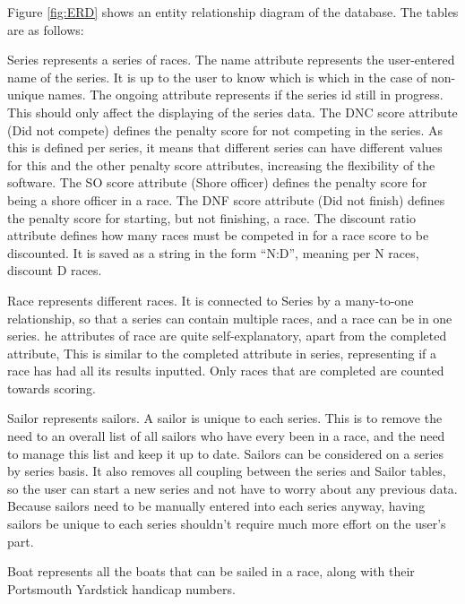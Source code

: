 \documentclass{l4proj}
\begin{document}
Figure \ref{fig:ERD} shows an entity relationship diagram of the database. The tables are as follows:
\begin{outline}
    \1
    Series represents a series of races.
        \2
        The name attribute represents the user-entered name of the series. It is up to the user to know which is which in the case of non-unique names.
        \2
        The ongoing attribute represents if the series id still in progress. This should only affect the displaying of the series data.
        \2
        The DNC score attribute (Did not compete) defines the penalty score for not competing in the series. As this is defined per series, it means that different series can have different values for this and the other penalty score attributes, increasing the flexibility of the software.
        \2
        The SO score attribute (Shore officer) defines the penalty score for being a shore officer in a race.
        \2
        The DNF score attribute (Did not finish) defines the penalty score for starting, but not finishing, a race.
        \2
        The discount ratio attribute defines how many races must be competed in for a race score to be discounted. It is saved as a string in the form “N:D”, meaning per N races, discount D races.
    
    \1
    Race represents different races. It is connected to Series by a many-to-one relationship, so that a series can contain multiple races, and a race can be in one series. he attributes of race are quite self-explanatory, apart from the completed attribute, This is similar to the completed attribute in series, representing if a race has had all its results inputted. Only races that are completed are counted towards scoring.
    
    \1
    Sailor represents sailors. A sailor is unique to each series. This is to remove the need to an overall list of all sailors who have every been in a race, and the need to manage this list and keep it up to date. Sailors can be considered on a series by series basis. It also removes all coupling between the series and Sailor tables, so the user can start a new series and not have to worry about any previous data. Because sailors need to be manually entered into each series anyway, having sailors be unique to each series shouldn't require much more effort on the user’s part.
    
    \1
    Boat represents all the boats that can be sailed in a race, along with their Portsmouth Yardstick handicap numbers.
    

\end{outline}
\end{document}
